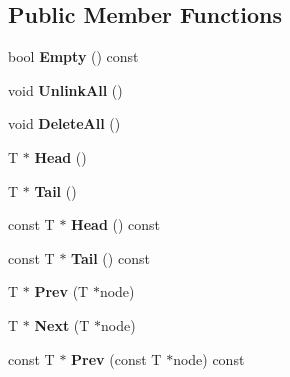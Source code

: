 \subsection*{Public Member Functions}
\begin{DoxyCompactItemize}
\item 
\hypertarget{class_t_list_a2944c214a30f44ea70a18cc3119fe5e8}{bool {\bfseries Empty} () const }\label{class_t_list_a2944c214a30f44ea70a18cc3119fe5e8}

\item 
\hypertarget{class_t_list_a35523aa9323bdecc29cdf532f664ce4b}{void {\bfseries Unlink\-All} ()}\label{class_t_list_a35523aa9323bdecc29cdf532f664ce4b}

\item 
\hypertarget{class_t_list_a75f2706f45be3121725c8b5d188ccc4e}{void {\bfseries Delete\-All} ()}\label{class_t_list_a75f2706f45be3121725c8b5d188ccc4e}

\item 
\hypertarget{class_t_list_a84b55b38d4bf09fc4989596dfae53f05}{T $\ast$ {\bfseries Head} ()}\label{class_t_list_a84b55b38d4bf09fc4989596dfae53f05}

\item 
\hypertarget{class_t_list_a2cfaae525a445b323901fc693d0f87ab}{T $\ast$ {\bfseries Tail} ()}\label{class_t_list_a2cfaae525a445b323901fc693d0f87ab}

\item 
\hypertarget{class_t_list_ac60011fb6f5d53c36dac5864b7653a92}{const T $\ast$ {\bfseries Head} () const }\label{class_t_list_ac60011fb6f5d53c36dac5864b7653a92}

\item 
\hypertarget{class_t_list_ad93c3c6b83afbe1c0821bb23c9a4f974}{const T $\ast$ {\bfseries Tail} () const }\label{class_t_list_ad93c3c6b83afbe1c0821bb23c9a4f974}

\item 
\hypertarget{class_t_list_ae747a3c922486b6bd4b6c334ced276c6}{T $\ast$ {\bfseries Prev} (T $\ast$node)}\label{class_t_list_ae747a3c922486b6bd4b6c334ced276c6}

\item 
\hypertarget{class_t_list_ac44a19580c48820ec487a9aa3324dca6}{T $\ast$ {\bfseries Next} (T $\ast$node)}\label{class_t_list_ac44a19580c48820ec487a9aa3324dca6}

\item 
\hypertarget{class_t_list_ad6577416af27d88bdcceae6c46a7ad57}{const T $\ast$ {\bfseries Prev} (const T $\ast$node) const }\label{class_t_list_ad6577416af27d88bdcceae6c46a7ad57}


\end{DoxyCompactItemize}
